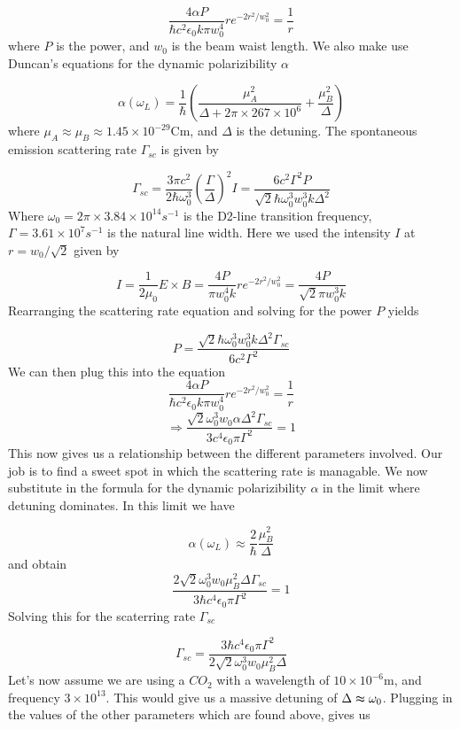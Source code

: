 \[
\frac{4\alpha P}{\hbar c^{2}\epsilon_{0}k\pi w_{0}^{4}}re^{-2r^{2}/w_{0}^{2}}=\frac{1}{r}
\]
where $P$ is the power, and $w_{0}$ is the beam waist length. We
also make use Duncan's equations for the dynamic polarizibility $\alpha$

\[
\alpha\left(\omega_{L}\right)=\frac{1}{\hbar}\left(\frac{\mu_{A}^{2}}{\Delta+2\pi\times267\times10^{6}}+\frac{\mu_{B}^{2}}{\Delta}\right)
\]
where $\mu_{A}\approx\mu_{B}\approx1.45\times10^{-29}$Cm, and $\Delta$
is the detuning. The spontaneous emission scattering rate $\Gamma_{sc}$
is given by

\[
\Gamma_{sc}=\frac{3\pi c^{2}}{2\hbar\omega_{0}^{3}}\left(\frac{\Gamma}{\Delta}\right)^{2}I=\frac{6c^{2}\Gamma^{2}P}{\sqrt{2}\hbar\omega_{0}^{3}w_{0}^{3}k\Delta^{2}}
\]
Where $\omega_{0}=2\pi\times3.84\times10^{14}s^{-1}$ is the D2-line
transition frequency, $\Gamma=3.61\times10^{7}s^{-1}$ is the natural
line width. Here we used the intensity $I$ at $r=w_{0}/\sqrt{2}$
given by

\[
I=\frac{1}{2\mu_{0}}E\times B=\frac{4P}{\pi w_{0}^{4}k}re^{-2r^{2}/w_{0}^{2}}=\frac{4P}{\sqrt{2}\pi w_{0}^{3}k}
\]
Rearranging the scattering rate equation and solving for the power
$P$ yields

\[
P=\frac{\sqrt{2}\hbar\omega_{0}^{3}w_{0}^{3}k\Delta^{2}\Gamma_{sc}}{6c^{2}\Gamma^{2}}
\]
We can then plug this into the equation
\[
\frac{4\alpha P}{\hbar c^{2}\epsilon_{0}k\pi w_{0}^{4}}re^{-2r^{2}/w_{0}^{2}}=\frac{1}{r}
\]
\[
\Rightarrow\frac{\sqrt{2}\omega_{0}^{3}w_{0}\alpha\Delta^{2}\Gamma_{sc}}{3c^{4}\epsilon_{0}\pi\Gamma^{2}}=1
\]
This now gives us a relationship between the different parameters
involved. Our job is to find a sweet spot in which the scattering
rate is managable. We now substitute in the formula for the dynamic
polarizibility $\alpha$ in the limit where detuning dominates. In
this limit we have

\[
\alpha\left(\omega_{L}\right)\approx\frac{2}{\hbar}\frac{\mu_{B}^{2}}{\Delta}
\]
and obtain
\[
\frac{2\sqrt{2}\omega_{0}^{3}w_{0}\mu_{B}^{2}\Delta\Gamma_{sc}}{3\hbar c^{4}\epsilon_{0}\pi\Gamma^{2}}=1
\]
Solving this for the scaterring rate $\Gamma_{sc}$

\[
\Gamma_{sc}=\frac{3\hbar c^{4}\epsilon_{0}\pi\Gamma^{2}}{2\sqrt{2}\omega_{0}^{3}w_{0}\mu_{B}^{2}\Delta}
\]
Let's now assume we are using a $CO_{2}$ with a wavelength of $10\times10^{-6}$m,
and frequency $3\times10^{13}$. This would give us a massive detuning
of $\Delta\thickapprox\omega_{0}$. Plugging in the values of the
other parameters which are found above, gives us

